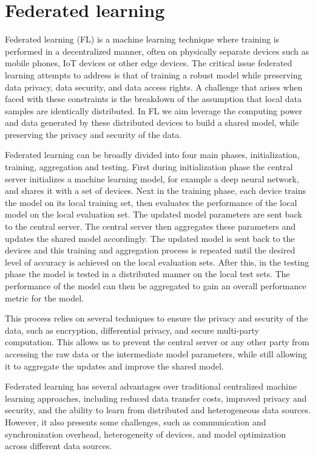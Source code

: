 \section{Federated learning}


Federated learning (FL) \cite{FederatedLearning} is a machine learning technique where training is performed in a decentralized manner, often on physically separate devices such as mobile phones, IoT devices or other edge devices. 
The critical issue federated learning attempts to address is that of training a robust model while preserving data privacy, data security, and data access rights.
A challenge that arises when faced with these constraints is the breakdown of the assumption that local data samples are identically distributed.
In FL we aim leverage the computing power and data generated by these distributed devices to build a shared model, while preserving the privacy and security of the data.

Federated learning can be broadly divided into four main phases, initialization, training, aggregation and testing. 
First during initialization phase the central server initializes a machine learning model, for example a deep neural network, and shares it with a set of devices. 
Next in the training phase, each device trains the model on its local training set, then evaluates the performance of the local model on the local evaluation set. 
The updated model parameters are sent back to the central server. 
The central server then aggregates these parameters and updates the shared model accordingly.
The updated model is sent back to the devices and this training and aggregation process is repeated until the desired level of accuracy is achieved on the local evaluation sets.
After this, in the testing phase the model is tested in a distributed manner on the local test sets. The performance of the model can then be aggregated to gain an overall performance metric for the model.

This process relies on several techniques to ensure the privacy and security of the data, such as encryption, differential privacy, and secure multi-party computation. This allows us to prevent the central server or any other party from accessing the raw data or the intermediate model parameters, while still allowing it to aggregate the updates and improve the shared model.

Federated learning has several advantages over traditional centralized machine learning approaches, including reduced data transfer costs, improved privacy and security, and the ability to learn from distributed and heterogeneous data sources. However, it also presents some challenges, such as communication and synchronization overhead, heterogeneity of devices, and model optimization across different data sources.

